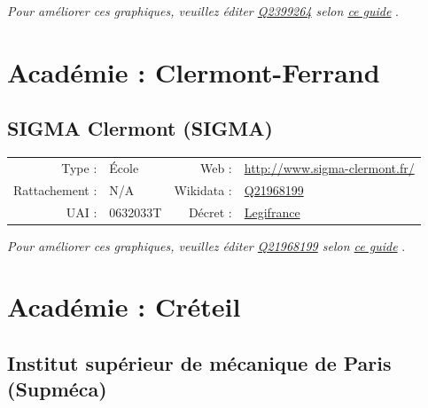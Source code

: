 \documentclass[11pt,french,landscape]{article}
\begin{document}
\textit{\scriptsize Pour améliorer ces graphiques, veuillez éditer \href{https://www.wikidata.org/entity/Q2399264}{Q2399264}  selon \href{https://github.com/cpesr/wikidataESR/blob/master/Rmd/wikidataESR.md}{ce guide}}
.


\newpage

\hypertarget{acaduxe9mie-clermont-ferrand-1}{%
\section{Académie :
Clermont-Ferrand}\label{acaduxe9mie-clermont-ferrand-1}}

\hypertarget{sigma-clermont-sigma}{%
\subsection{SIGMA Clermont (SIGMA)}\label{sigma-clermont-sigma}}

\begin{tabular*}{0.45\textwidth}{rp{2cm}rl}  
\hline  
Type : & École & Web : &\href{http://www.sigma-clermont.fr/}{http://www.sigma-clermont.fr/} \\  
Rattachement : & N/A & Wikidata : & \href{https://www.wikidata.org/entity/Q21968199}{Q21968199} \\  
UAI : & 0632033T & Décret : & \href{http://www.legifrance.gouv.fr/affichTexte.do?cidTexte=JORFTEXT000031691554&categorieLien=id}{Legifrance} \\  
\hline  
\end{tabular*}

\textit{\scriptsize Pour améliorer ces graphiques, veuillez éditer \href{https://www.wikidata.org/entity/Q21968199}{Q21968199}  selon \href{https://github.com/cpesr/wikidataESR/blob/master/Rmd/wikidataESR.md}{ce guide}}
.


\newpage

\hypertarget{acaduxe9mie-cruxe9teil-1}{%
\section{Académie : Créteil}\label{acaduxe9mie-cruxe9teil-1}}

\hypertarget{institut-supuxe9rieur-de-muxe9canique-de-paris-supmuxe9ca}{%
\subsection{Institut supérieur de mécanique de Paris
(Supméca)}\label{institut-supuxe9rieur-de-muxe9canique-de-paris-supmuxe9ca}}
\end{document}
